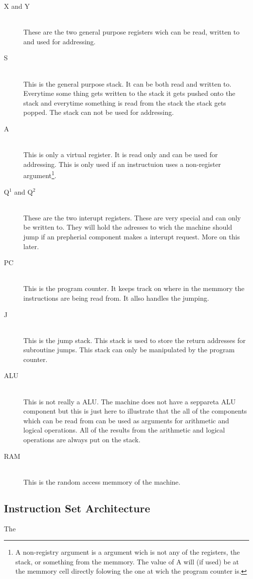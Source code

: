 \documentclass{article}
\begin{document}
\begin{description}
  \item[X and Y] \hfill \\ 
  These are the two general purpose registers wich can be read,
  written to and used for addressing.
  \item[S] \hfill \\
  This is the general purpose stack. It can be both read and
  written to. Everytime some thing gets written to the stack it gets pushed onto the
  stack and everytime something is read from the stack the stack gets popped.
  The stack can not be used for addressing.
  \item[A] \hfill \\
  This is only a virtual register. It is read only and can be used for
  addressing. This is only used if an instructuion uses a non-register
  argument\footnote{A non-registry argument is a argument wich is not any of
  the registers, the stack, or something from the memmory. The value of A will
  (if used) be at the memmory cell directly folowing the one at wich the
  program counter is.}.
  \item[Q$^1$ and Q$^2$] \hfill \\
  These are the two interupt registers. These are very special and can only be
  written to. They will hold the adresses to wich the machine should jump if an
  prepherial component makes a interupt request. More on this later.
  \item[PC]\hfill \\
  This is the program counter. It keeps track on where in the memmory the 
  instructions are being read from. It allso handles the jumping.
  \item[J]\hfill \\
  This is the jump stack. This stack is used to store the return addresses for
  subroutine jumps. This stack can only be manipulated by the program counter.
  \item[ALU]\hfill \\
  This is not really a ALU. The machine does not have a seppareta ALU component
  but this is just here to illustrate that the all of the components which can
  be read from can be used as arguments for arithmetic and logical operations.
  All of the results from the arithmetic and logical operations are always put
  on the stack.
  \item[RAM]\hfill \\
  This is the random access memmory of the machine.
\end{description}

\subsection{Instruction Set Architecture}
The
\end{document}
